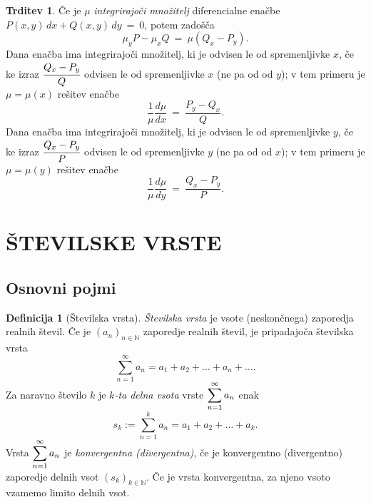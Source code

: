 \documentclass[11pt]{article}
\theoremstyle{definition}
\newtheorem{definicija}{Definicija}[section]
\theoremstyle{definition}
\newtheorem{trditev}{Trditev}[section]
\theoremstyle{definition}
\theoremstyle{theorem}
\begin{document}
\begin{trditev}

Če je $\mu$ \textit{integrirajoči množitelj} diferencialne enačbe \\$P(x, y)\,dx + Q(x, y)\,dy ~=~ 0$, potem zadošča 
$$\mu_y P - \mu_x Q ~=~ \mu(Q_x - P_y).$$
Dana enačba ima integrirajoči množitelj, ki je odvisen le od spremenljivke $x$, če ke izraz $\cfrac{Q_x - P_y}{Q}$ odvisen le od spremenljivke $x$ (ne pa od od $y$); v tem primeru je $\mu = \mu(x)$ rešitev enačbe
$$\frac{1}{\mu} \frac{d\mu}{dx} ~=~ \frac{P_y - Q_x}{Q}.$$
Dana enačba ima integrirajoči množitelj, ki je odvisen le od spremenljivke $y$, če ke izraz $\cfrac{Q_x - P_y}{P}$ odvisen le od spremenljivke $y$ (ne pa od od $x$); v tem primeru je $\mu = \mu(y)$ rešitev enačbe
$$\frac{1}{\mu} \frac{d\mu}{dy} ~=~ \frac{Q_x - P_y}{P}.$$


\end{trditev}
\vspace{0.5cm}


\pagebreak


\section{ŠTEVILSKE VRSTE}
\vspace{0.5cm}


\subsection{Osnovni pojmi}
\vspace{0.5cm}

\begin{definicija}[Številska vrsta]

\textit{Številska vrsta} je vsote (neskončnega) \hbox{zaporedja} realnih števil. Če je $(a_n)_{n \in \mathbb{N}}$ zaporedje realnih števil, je \hbox{pripadajoča} številska vrsta
$$\sum_{n=1}^{\infty} a_n = a_1 + a_2 + \ldots + a_n + \ldots .$$
Za naravno število $k$ je \textit{$k$-ta delna vsota} vrste $\mathlarger{\sum_{n=1}^{\infty} a_n}$ enak
$$s_k := \sum_{n=1}^{k} a_n = a_1 + a_2 + \ldots + a_k.$$
Vrsta $\mathlarger{\sum_{n=1}^{\infty} a_n}$ je \textit{konvergentna (divergentna)}, če je konvergentno (divergentno) zaporedje delnih vsot $(s_k)_{k \in \mathbb{N}}$. Če je vrsta konvergentna, za njeno vsoto vzamemo limito delnih vsot.

\end{definicija}
\vspace{0.5cm}
\end{document}
